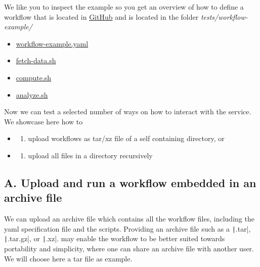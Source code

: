 We like you to inspect the example so you get an overview of how to
define a workflow that is located in
\href{https://github.com/cloudmesh/cloudmesh-cc/tree/main/tests/workflow-example}{GitHub} and is located in the folder \emph{tests/workflow-example/}

\begin{itemize}
\item
  \href{https://github.com/cloudmesh/cloudmesh-cc/blob/main/tests/workflow-example/workflow-example.yaml}{workflow-example.yaml}
\item
  \href{https://github.com/cloudmesh/cloudmesh-cc/blob/main/tests/workflow-example/fetch-data.sh}{fetch-data.sh}
\item
  \href{https://github.com/cloudmesh/cloudmesh-cc/blob/main/tests/workflow-example/compute.sh}{compute.sh}
\item
  \href{https://github.com/cloudmesh/cloudmesh-cc/blob/main/tests/workflow-example/analyze.sh}{analyze.sh}
\end{itemize}

Now we can test a selected number of ways on how to interact with the
service. We showcase here how to

\begin{itemize}
\item
  \begin{enumerate}
  \def\labelenumi{\Alph{enumi}.}
  \item
    upload workflows as tar/xz file of a self containing directory, or
  \end{enumerate}
\item
  \begin{enumerate}
  \def\labelenumi{\Alph{enumi}.}
  \setcounter{enumi}{1}
  \item
    upload all files in a directory recursively
  \end{enumerate}
\end{itemize}

\subsection{A. Upload and run a workflow embedded in an archive
file}\label{a.-upload-and-run-a-workflow-embedded-in-an-archive-file}

We can upload an archive file which contains all the workflow files,
including the yaml specification file and the scripts. Providing an
archive file such as a \texttt|.tar|, \texttt|.tar.gz|, or \texttt|.xz|.
may enable the workflow to be better suited towards portability and
simplicity, where one can share an archive file with another user. We
will choose here a tar file as example.

